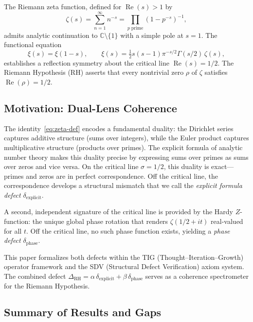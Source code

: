 \documentclass[11pt]{article}
\theoremstyle{remark}
\DeclareMathOperator{\Rea}{Re}
\begin{document}
The Riemann zeta function, defined for $\Rea(s)>1$ by
\begin{equation}\label{eq:zeta-def}
  \zeta(s) = \sum_{n=1}^{\infty} n^{-s} = \prod_{p\;\mathrm{prime}} (1-p^{-s})^{-1},
\end{equation}
admits analytic continuation to $\mathbb{C}\setminus\{1\}$ with a simple pole at $s=1$.
The functional equation
\begin{equation}\label{eq:func-eq}
  \xi(s) = \xi(1-s), \qquad \xi(s) = \tfrac{1}{2}s(s-1)\pi^{-s/2}\Gamma(s/2)\,\zeta(s),
\end{equation}
establishes a reflection symmetry about the critical line $\Rea(s)=1/2$.
The Riemann Hypothesis (RH) asserts that every nontrivial zero $\rho$ of $\zeta$
satisfies $\Rea(\rho)=1/2$.

\subsection{Motivation: Dual-Lens Coherence}

The identity~\eqref{eq:zeta-def} encodes a fundamental duality: the Dirichlet series
captures additive structure (sums over integers), while the Euler product captures
multiplicative structure (products over primes).
The explicit formula of analytic number theory makes this duality precise by
expressing sums over primes as sums over zeros and vice versa.
On the critical line $\sigma=1/2$, this duality is exact---primes and zeros are in
perfect correspondence.
Off the critical line, the correspondence develops a structural mismatch that we
call the \emph{explicit formula defect} $\delta_{\mathrm{explicit}}$.

A second, independent signature of the critical line is provided by the Hardy
$Z$-function: the unique global phase rotation that renders $\zeta(1/2+it)$
real-valued for all $t$.
Off the critical line, no such phase function exists, yielding a \emph{phase defect}
$\delta_{\mathrm{phase}}$.

This paper formalizes both defects within the TIG (Thought--Iteration--Growth)
operator framework and the SDV (Structural Defect Verification) axiom system.
The combined defect $\Delta_{\mathrm{RH}}=\alpha\,\delta_{\mathrm{explicit}}
+\beta\,\delta_{\mathrm{phase}}$ serves as a coherence spectrometer for the
Riemann Hypothesis.

\subsection{Summary of Results and Gaps}
\end{document}
